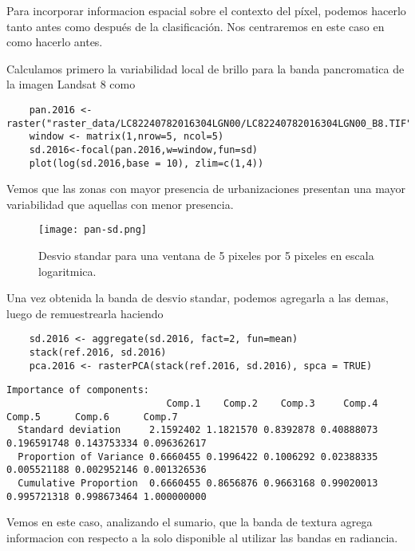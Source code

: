 \begin{exa}
  Para incorporar informacion espacial sobre el contexto del p\'ixel, podemos
  hacerlo tanto antes como despu\'es de la clasificaci\'on. Nos centraremos
  en este caso en como hacerlo antes.

  Calculamos primero la variabilidad local de brillo para la banda pancromatica
  de la imagen Landsat 8 como

  \begin{lstlisting}
    pan.2016 <- raster("raster_data/LC82240782016304LGN00/LC82240782016304LGN00_B8.TIF")
    window <- matrix(1,nrow=5, ncol=5)
    sd.2016<-focal(pan.2016,w=window,fun=sd)
    plot(log(sd.2016,base = 10), zlim=c(1,4))
  \end{lstlisting}

  Vemos que las zonas con mayor presencia de urbanizaciones presentan una mayor variabilidad que aquellas con menor presencia.

  \begin{figure}[h!]
    \centering
    \texttt{[image: pan-sd.png]}
    \caption{Desvio standar para una ventana de 5 pixeles por 5 pixeles en escala logaritmica.}
    \label{fig:pansd}
  \end{figure}

  Una vez obtenida la banda de desvio standar, podemos agregarla a las demas, luego
  de remuestrearla haciendo

  \begin{lstlisting}
    sd.2016 <- aggregate(sd.2016, fact=2, fun=mean)
    stack(ref.2016, sd.2016)
    pca.2016 <- rasterPCA(stack(ref.2016, sd.2016), spca = TRUE)
  \end{lstlisting}

  \begin{Verbatim}[fontsize=\small]
  Importance of components:
                            Comp.1    Comp.2    Comp.3     Comp.4      Comp.5      Comp.6      Comp.7
  Standard deviation     2.1592402 1.1821570 0.8392878 0.40888073 0.196591748 0.143753334 0.096362617
  Proportion of Variance 0.6660455 0.1996422 0.1006292 0.02388335 0.005521188 0.002952146 0.001326536
  Cumulative Proportion  0.6660455 0.8656876 0.9663168 0.99020013 0.995721318 0.998673464 1.000000000
  \end{Verbatim}

  Vemos en este caso, analizando el sumario, que la banda de textura agrega informacion
  con respecto a la solo disponible al utilizar las bandas en radiancia.
\end{exa}

